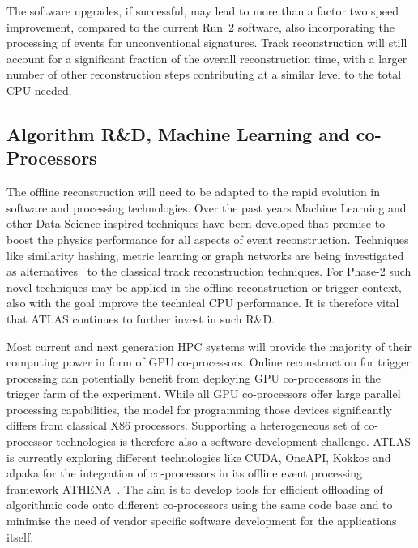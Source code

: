 The software upgrades, if successful, may lead to more than a factor two speed improvement, compared to the current Run~2 software, also incorporating the processing of events for unconventional signatures. Track reconstruction will still account for a significant fraction of the overall reconstruction time, with a larger number of other reconstruction steps contributing at a similar level to the total CPU needed.


\subsection{Algorithm R\&D, Machine Learning and co-Processors}

The offline reconstruction will need to be adapted to the rapid evolution in software and processing technologies. Over the past years Machine Learning and other Data Science inspired techniques have been developed that promise to boost the physics performance for all aspects of event reconstruction. Techniques like similarity hashing, metric learning or graph networks are being investigated as alternatives~\cite{InstutitePascalTracking} to the classical track reconstruction techniques. For Phase-2 such novel techniques may be applied in the offline reconstruction or trigger context, also with the goal improve the technical CPU performance. It is therefore vital that ATLAS continues to further invest in such R\&D.

Most current and next generation HPC systems will provide the majority of their computing power in form of GPU co-processors. Online reconstruction for trigger processing can potentially benefit from deploying GPU co-processors in the trigger farm of the experiment. While all GPU co-processors offer large parallel processing capabilities, the model for programming those devices significantly differs from classical X86 processors. Supporting a heterogeneous set of co-processor technologies is therefore also a software development challenge. ATLAS is currently exploring different technologies like CUDA, OneAPI, Kokkos and alpaka for the integration of co-processors in its offline event processing framework ATHENA~\cite{ATHENA}. The aim is to develop tools for efficient offloading of algorithmic code onto different co-processors using the same code base and to minimise the need of vendor specific software development for the applications itself.

